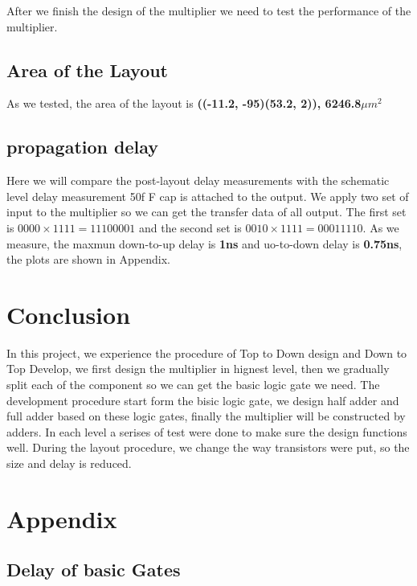 \documentclass[conference]{IEEEtran}
\begin{document}
After we finish the design of the multiplier we need to test the performance of the multiplier.

\subsection{Area of the Layout}

As we tested, the area of the layout is \textbf{((-11.2, -95)(53.2, 2)), 6246.8$\mu m^2$}

\subsection{propagation delay}

Here we will compare the post-layout delay measurements with the schematic level delay measurement 50f F cap is attached to the output. We apply two set of input to the multiplier so we can get the transfer data of all output. The first set is $0000 \times 1111 = 11100001$ and the second set is $0010 \times 1111 = 00011110$. As we measure, the maxmun down-to-up delay is \textbf{1ns} and uo-to-down delay is \textbf{0.75ns}, the plots are shown in Appendix.

\section{Conclusion}

In this project, we experience the procedure of Top to Down design and Down to Top Develop, we first design the multiplier in hignest level, then we gradually split each of the component so we can get the basic logic gate we need. The development procedure start form the bisic logic gate, we design half adder and full adder based on these logic gates, finally the multiplier will be constructed by adders. In each level a serises of test were done to make sure the design functions well. During the layout procedure, we change the way transistors were put, so the size and delay is reduced.


% 




\newpage
\section{Appendix}

\subsection{Delay of basic Gates}
\end{document}
